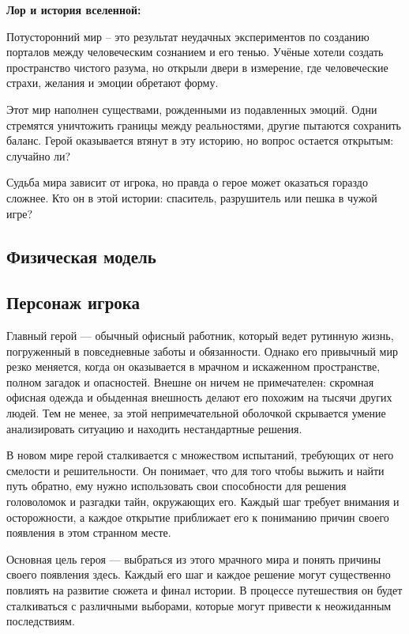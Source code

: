 \documentclass{article}
\begin{document}
	\newpage
	\textbf{Лор и история вселенной:}
	
	Потусторонний мир – это результат неудачных экспериментов по созданию порталов между человеческим сознанием и его тенью. Учёные хотели создать пространство чистого разума, но открыли двери в измерение, где человеческие страхи, желания и эмоции обретают форму.
	
	Этот мир наполнен существами, рожденными из подавленных эмоций. Одни стремятся уничтожить границы между реальностями, другие пытаются сохранить баланс. Герой оказывается втянут в эту историю, но вопрос остается открытым: случайно ли?
	
	Судьба мира зависит от игрока, но правда о герое может оказаться гораздо сложнее. Кто он в этой истории: спаситель, разрушитель или пешка в чужой игре?

	\subsection{Физическая модель}
    
        \newpage
	\subsection{Персонаж игрока}
    Главный герой — обычный офисный работник, который ведет рутинную жизнь, погруженный в повседневные заботы и обязанности. Однако его привычный мир резко меняется, когда он оказывается в мрачном и искаженном пространстве, полном загадок и опасностей. Внешне он ничем не примечателен: скромная офисная одежда и обыденная внешность делают его похожим на тысячи других людей. Тем не менее, за этой непримечательной оболочкой скрывается умение анализировать ситуацию и находить нестандартные решения.

    В новом мире герой сталкивается с множеством испытаний, требующих от него смелости и решительности. Он понимает, что для того чтобы выжить и найти путь обратно, ему нужно использовать свои способности для решения головоломок и разгадки тайн, окружающих его. Каждый шаг требует внимания и осторожности, а каждое открытие приближает его к пониманию причин своего появления в этом странном месте.

    Основная цель героя — выбраться из этого мрачного мира и понять причины своего появления здесь. Каждый его шаг и каждое решение могут существенно повлиять на развитие сюжета и финал истории. В процессе путешествия он будет сталкиваться с различными выборами, которые могут привести к неожиданным последствиям. 
\end{document}
